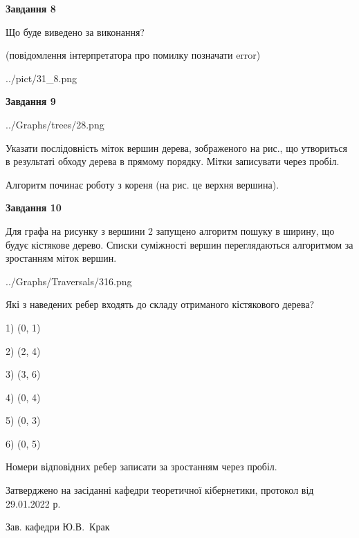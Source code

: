 \documentclass[12pt, ukrainian]{article}
\begin{document}
{\begin {large}
{\begin {center}\textbf{Завдання 8}\end {center}}\par
Що буде виведено за виконання?\par
 (повідомлення інтерпретатора про помилку позначати error)\par
\begin{center}
	{../pict/31_8.png}
\end{center}
\newpage

{\begin {center}\textbf{Завдання 9}\end {center}}\par

\begin{center}
	{../Graphs/trees/28.png}
\end{center}
Указати послідовність міток вершин дерева, зображеного на рис., що утвориться в результаті обходу дерева в прямому порядку. Мітки записувати через пробіл.\par Алгоритм починає роботу з кореня (на рис. це верхня вершина).\par
\newpage

{\begin {center}\textbf{Завдання 10}\end {center}}\par
Для графа на рисунку з вершини 2 запущено алгоритм пошуку в ширину, що будує кістякове дерево. Списки суміжності вершин переглядаються алгоритмом за зростанням міток вершин.\par
\begin{center}
	{../Graphs/Traversals/316.png}
\end{center}
\par Які з наведених ребер входять до складу отриманого кістякового дерева?\par
1) (0, 1)\par
2) (2, 4)\par
3) (3, 6)\par
4) (0, 4)\par
5) (0, 3)\par
6) (0, 5)\par
{\vskip 15pt} Номери відповідних ребер записати за зростанням через пробіл.\par
\newpage


\end {large}
}
{\smallskip \begin {small} Затверджено на засіданні кафедри теоретичної кібернетики, протокол  від   29.01.2022 р.\par\smallskip\smallskip
{\parbox {6.5 cm}{Зав. кафедри \dotfill Ю.В.~Крак}} \end{small}}
\end{document}
